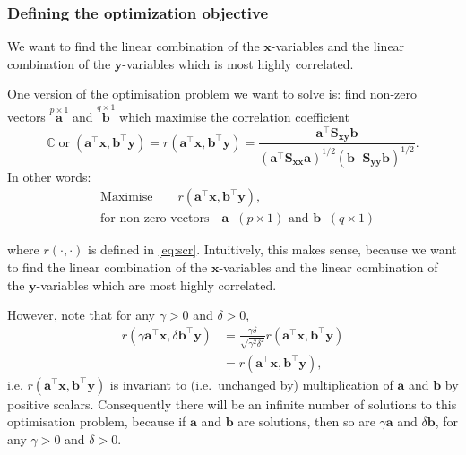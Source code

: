 \documentclass[]{book}
\theoremstyle{definition}
\theoremstyle{definition}
\theoremstyle{definition}
\theoremstyle{remark}
\begin{document}
\hypertarget{defining-the-optimization-objective}{%
\subsubsection*{Defining the optimization objective}\label{defining-the-optimization-objective}}

We want to find the linear combination of the \(\boldsymbol x\)-variables and the linear combination of the \(\boldsymbol y\)-variables which is most highly correlated.

One version of the optimisation problem we want to solve is: find non-zero vectors \(\stackrel{p \times 1}{\boldsymbol a}\) and \(\stackrel{q \times 1}{\boldsymbol b}\) which maximise the correlation coefficient
\[
{\mathbb{C}\operatorname{or}}(\boldsymbol a^\top \boldsymbol x,\boldsymbol b^\top \boldsymbol y)=r(\boldsymbol a^\top \boldsymbol x,\boldsymbol b^\top \boldsymbol y)=\frac{\boldsymbol a^\top \boldsymbol S_{\boldsymbol x\boldsymbol y}\boldsymbol b}{(\boldsymbol a^\top \boldsymbol S_{\boldsymbol x\boldsymbol x}\boldsymbol a)^{1/2}(\boldsymbol b^\top \boldsymbol S_{\boldsymbol y\boldsymbol y}\boldsymbol b)^{1/2}}.
\]
In other words:
\begin{align}
&\mbox{Maximise} \qquad  r(\boldsymbol a^\top \boldsymbol x,\boldsymbol b^\top \boldsymbol y),
\label{eq:opt26}\\
  &\mbox{for non-zero vectors}\quad  \boldsymbol a\;\; (p \times 1)\mbox{ and  } \boldsymbol b\;\; (q \times 1) \nonumber
\end{align}

where \(r(\cdot,\cdot)\) is defined in \eqref{eq:scr}.
Intuitively, this makes sense, because we want to find the linear combination of the \(\boldsymbol x\)-variables and the linear combination of the \(\boldsymbol y\)-variables which are most highly correlated.

However, note that for any \(\gamma>0\) and \(\delta>0\),
\begin{align}
  r(\gamma\boldsymbol a^\top \boldsymbol x, \delta \boldsymbol b^\top \boldsymbol y)&= \frac{\gamma \delta}{\sqrt{\gamma^2 \delta^2}}r(\boldsymbol a^\top \boldsymbol x,\boldsymbol b^\top \boldsymbol y)\\
  &=r(\boldsymbol a^\top \boldsymbol x,\boldsymbol b^\top \boldsymbol y),
  \label{eq:invar}
  \end{align}
i.e. \(r(\boldsymbol a^\top \boldsymbol x,\boldsymbol b^\top \boldsymbol y)\) is invariant to (i.e.~unchanged by) multiplication of \(\boldsymbol a\) and \(\boldsymbol b\) by positive scalars. Consequently there will be an infinite number of solutions to this optimisation problem, because if \(\boldsymbol a\) and \(\boldsymbol b\) are solutions, then so are \(\gamma \boldsymbol a\) and \(\delta \boldsymbol b\), for any \(\gamma>0\) and \(\delta>0\).
\end{document}
